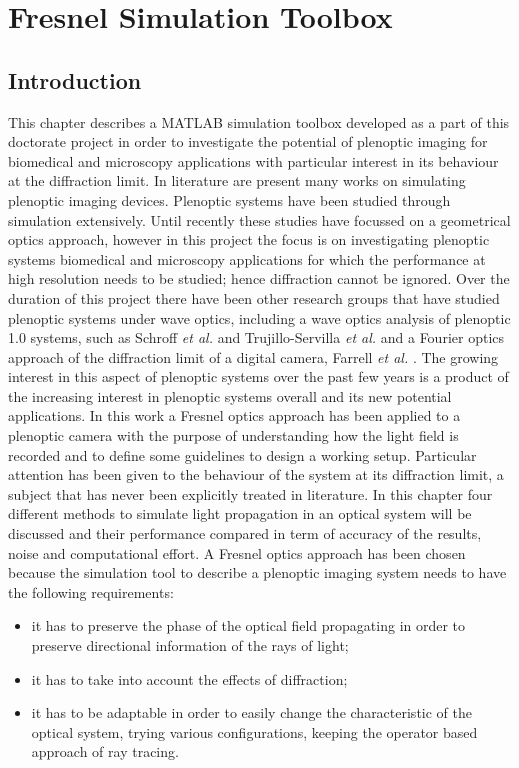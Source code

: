 \chapter{Fresnel Simulation Toolbox}
\label{chap:fresnel}
\section{Introduction}
\label{sec:intro}
This chapter describes a MATLAB simulation toolbox developed as a part of this doctorate project in order to investigate the potential of plenoptic imaging for biomedical and microscopy applications with particular interest in its behaviour at the diffraction limit. In literature are present many works on simulating plenoptic imaging devices. Plenoptic systems have been studied through simulation extensively. Until recently these studies have focussed on a geometrical optics approach, however in this project the focus is on investigating plenoptic systems biomedical and microscopy applications for which the performance at high resolution needs to be studied; hence diffraction cannot be ignored. Over the duration of this project there have been other research groups that have studied plenoptic systems under wave optics, including a wave optics analysis of plenoptic 1.0 systems, such as Schroff \textit{et al.} \cite{shroff2012high,shroff2013image} and Trujillo-Servilla \textit{et al.} \cite{birch2012depth} and a Fourier optics approach of the diffraction limit of a digital camera, Farrell \textit{et al.} \cite{farrell2012digital}. The growing interest in this aspect of plenoptic systems over the past few years is a product of the increasing interest in plenoptic systems overall and its new potential applications. In this work a Fresnel optics approach has been applied to a plenoptic camera with the purpose of understanding how the light field is recorded and to define some guidelines to design a working setup. Particular attention has been given to the behaviour of the system at its diffraction limit, a subject that has never been explicitly treated in literature. In this chapter four different methods to simulate light propagation in an optical system will be discussed and their performance compared in term of accuracy of the results, noise and computational effort.
A Fresnel optics approach has been chosen because the simulation tool to describe a plenoptic imaging system needs to have the following requirements:
\begin{itemize}
	\item it has to preserve the phase of the optical field propagating in order to preserve directional information of the rays of light;
	\item it has to take into account the effects of diffraction;
	\item it has to be adaptable in order to easily change the characteristic of the optical system, trying various configurations, keeping the operator based approach of ray tracing.
\end{itemize}
